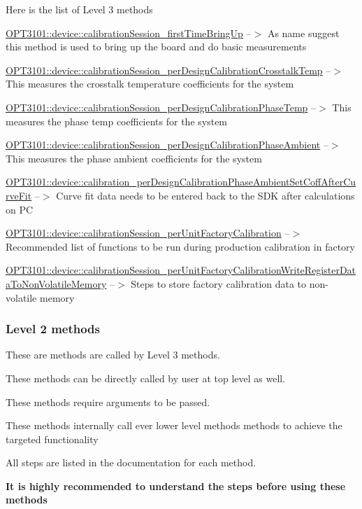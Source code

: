 Here is the list of Level 3 methods
\begin{DoxyEnumerate}
\item \mbox{\hyperlink{class_o_p_t3101_1_1device_a0dd8c59bc93c392f8d3f430697457415}{O\+P\+T3101\+::device\+::calibration\+Session\+\_\+first\+Time\+Bring\+Up}} --$>$ As name suggest this method is used to bring up the board and do basic measurements
\item \mbox{\hyperlink{class_o_p_t3101_1_1device_a6b44ee9769ae8a2debff7b475bccdfe4}{O\+P\+T3101\+::device\+::calibration\+Session\+\_\+per\+Design\+Calibration\+Crosstalk\+Temp}} --$>$ This measures the crosstalk temperature coefficients for the system
\item \mbox{\hyperlink{class_o_p_t3101_1_1device_aec05fdf2f9780dea74305720ccb1cf32}{O\+P\+T3101\+::device\+::calibration\+Session\+\_\+per\+Design\+Calibration\+Phase\+Temp}} --$>$ This measures the phase temp coefficients for the system
\item \mbox{\hyperlink{class_o_p_t3101_1_1device_a94c4e35aa43bc53eb8fe0d4c364aea25}{O\+P\+T3101\+::device\+::calibration\+Session\+\_\+per\+Design\+Calibration\+Phase\+Ambient}} --$>$ This measures the phase ambient coefficients for the system
\item \mbox{\hyperlink{class_o_p_t3101_1_1device_a3b278687f5414b66c614d83dcf229f80}{O\+P\+T3101\+::device\+::calibration\+\_\+per\+Design\+Calibration\+Phase\+Ambient\+Set\+Coff\+After\+Curve\+Fit}} --$>$ Curve fit data needs to be entered back to the S\+DK after calculations on PC
\item \mbox{\hyperlink{class_o_p_t3101_1_1device_abad5b2d7405e735fa80041dbbf47502c}{O\+P\+T3101\+::device\+::calibration\+Session\+\_\+per\+Unit\+Factory\+Calibration}} --$>$ Recommended list of functions to be run during production calibration in factory
\item \mbox{\hyperlink{class_o_p_t3101_1_1device_aa0a1b1f37d9aea753d7910de3e8c2799}{O\+P\+T3101\+::device\+::calibration\+Session\+\_\+per\+Unit\+Factory\+Calibration\+Write\+Register\+Data\+To\+Non\+Volatile\+Memory}} --$>$ Steps to store factory calibration data to non-\/volatile memory
\end{DoxyEnumerate}

\subsubsection*{Level 2 methods}


\begin{DoxyItemize}
\item These are methods are called by Level 3 methods.
\item These methods can be directly called by user at top level as well.
\item These methods require arguments to be passed.
\item These methods internally call ever lower level methods methods to achieve the targeted functionality
\item All steps are listed in the documentation for each method.
\item {\bfseries It is highly recommended to understand the steps before using these methods}
\end{DoxyItemize}

